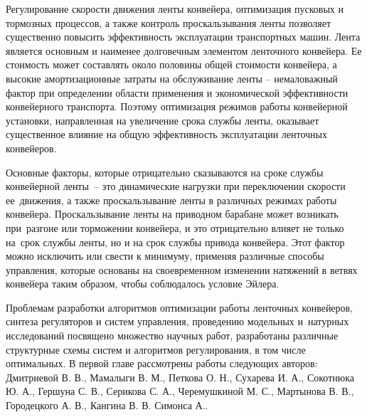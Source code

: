 Регулирование скорости движения ленты конвейера, оптимизация пусковых и тормозных процессов, а также контроль проскальзывания ленты позволяет существенно повысить эффективность эксплуатации транспортных машин. Лента является основным и наименее долговечным элементом ленточного конвейера. Ее стоимость может составлять около половины общей стоимости конвейера, а высокие амортизационные затраты на обслуживание ленты -- немаловажный фактор при определении области применения и экономической эффективности конвейерного транспорта. Поэтому оптимизация режимов работы конвейерной установки, направленная на увеличение срока службы ленты, оказывает существенное влияние на общую эффективность эксплуатации ленточных конвейеров.

Основные факторы, которые отрицательно сказываются на сроке службы конвейерной ленты~-- это динамические нагрузки при переключении скорости ее~движения, а также проскальзывание ленты в различных режимах работы конвейера. Проскальзывание ленты на приводном барабане может возникать при~разгоне или торможении конвейера, и это отрицательно влияет не только на~срок службы ленты, но и на срок службы привода конвейера. Этот фактор можно исключить или свести к минимуму, применяя различные способы управления, которые основаны на своевременном изменении натяжений в ветвях конвейера таким образом, чтобы соблюдалось условие Эйлера.

Проблемам разработки алгоритмов оптимизации работы ленточных конвейеров, синтеза регуляторов и систем управления, проведению модельных и~натурных исследований посвящено множество научных работ, разработаны различные структурные схемы систем и алгоритмов регулирования, в том числе оптимальных. В первой главе рассмотрены работы следующих авторов: Дмитриевой В. В., Мамалыги В. М., Петкова О. Н., Сухарева И. А., Сокотнюка Ю. А., Гершуна С. В., Серикова С. А., Черемушкиной М. С., Мартынова В. В., Городецкого А. В., Кангина В. В. Симонса А..

